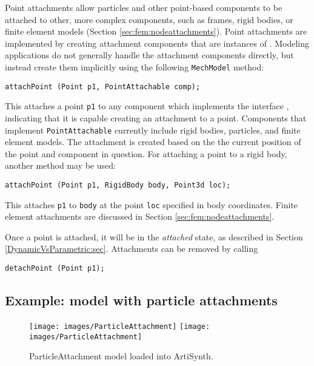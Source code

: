 Point attachments allow particles and other point-based components to
be attached to other, more complex components, such as frames, rigid
bodies, or finite element models (Section \ref{sec:fem:nodeattachments}). Point
attachments are implemented by creating attachment components that are
instances of .
Modeling applications do not generally handle the attachment
components directly, but instead create them implicitly using the
following {\tt MechModel} method:
\begin{lstlisting}[]
  attachPoint (Point p1, PointAttachable comp);
\end{lstlisting}
%
This attaches a point {\tt p1} to any component which implements the
interface ,
indicating that it is capable creating an attachment to a
point. Components that implement {\tt PointAttachable} currently
include rigid bodies, particles, and finite element models. The
attachment is created based on the the current position of the point
and component in question.  For attaching a point to a rigid body,
another method may be used:
\begin{lstlisting}[]
  attachPoint (Point p1, RigidBody body, Point3d loc);
\end{lstlisting}
%
This attaches {\tt p1} to {\tt body} at the point {\tt loc} specified
in body coordinates.  Finite element attachments are discussed in
Section \ref{sec:fem:nodeattachments}.

Once a point is attached, it
will be in the {\it attached} state, as described in Section
\ref{DynamicVsParametric:sec}.  Attachments can be removed by
calling
\begin{lstlisting}[]
  detachPoint (Point p1);   
\end{lstlisting}
%

\subsection{Example: model with particle attachments}

\begin{figure}[ht]
\begin{center}
\iflatexml
 \texttt{[image: images/ParticleAttachment]}
\else
 \texttt{[image: images/ParticleAttachment]}
\fi
\end{center}
\caption{ParticleAttachment model loaded into ArtiSynth.}
\label{ParticleAttachment:fig}
\end{figure}


